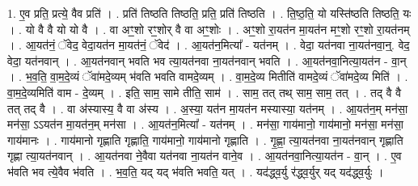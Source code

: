 \documentclass[17pt]{extarticle}
\begin{document}
1. ए॒व प्रति॒ प्रत्ये॒ वैव प्रति॑ । . प्रति॑ तिष्ठति तिष्ठति॒ प्रति॒ प्रति॑ तिष्ठति । . ति॒ष्ठ॒ति॒ यो यस्ति॑ष्ठति तिष्ठति॒ यः । . यो वै वै यो यो वै । . वा अꣳ॒॒शो रꣳ॒॒शोर् वै वा अꣳ॒॒शोः । . अꣳ॒॒शो रा॒यत॑न मा॒यत॑न मꣳ॒॒शो रꣳ॒॒शो रा॒यत॑नम् । . आ॒यत॑नं॒ ॅवेद॒ वेदा॒यत॑न मा॒यत॑नं॒ ॅवेद॑ । . आ॒यत॑न॒मित्या᳚ - यत॑नम् । . वेदा॒ यत॑नवा ना॒यत॑नवा॒न्॒. वेद॒ वेदा॒ यत॑नवान् । . आ॒यत॑नवान् भवति भव त्या॒यत॑नवा ना॒यत॑नवान् भवति । . आ॒यत॑नवा॒नित्या॒यत॑न - वा॒न् । . भ॒व॒ति॒ वा॒म॒दे॒व्यं ॅवा॑मदे॒व्यम् भ॑वति भवति वामदे॒व्यम् । . वा॒म॒दे॒व्य मितीति॑ वामदे॒व्यं ॅवा॑मदे॒व्य मिति॑ । . वा॒म॒दे॒व्यमिति॑ वाम - दे॒व्यम् । . इति॒ साम॒ सामे तीति॒ साम॑ । . साम॒ तत् तथ् साम॒ साम॒ तत् । . तद् वै वै तत् तद् वै । . वा अ॑स्यास्य॒ वै वा अ॑स्य । . अ॒स्या॒ यत॑न मा॒यत॑न मस्यास्या॒ यत॑नम् । . आ॒यत॑न॒म् मन॑सा॒ मन॑सा॒ ऽऽयत॑न मा॒यत॑न॒म् मन॑सा । . आ॒यत॑न॒मित्या᳚ - यत॑नम् । . मन॑सा॒ गाय॑मानो॒ गाय॑मानो॒ मन॑सा॒ मन॑सा॒ गाय॑मानः । . गाय॑मानो गृह्णाति गृह्णाति॒ गाय॑मानो॒ गाय॑मानो गृह्णाति । . गृ॒ह्णा॒ त्या॒यत॑नवा ना॒यत॑नवान् गृह्णाति गृह्णा त्या॒यत॑नवान् । . आ॒यत॑नवा ने॒वैवा यत॑नवा ना॒यत॑न वाने॒व । . आ॒यत॑नवा॒नित्या॒यत॑न - वा॒न् । . ए॒व भ॑वति भव त्ये॒वैव भ॑वति । . भ॒व॒ति॒ यद् यद् भ॑वति भवति॒ यत् । . यद॑द्ध्व॒र्यु र॑द्ध्व॒र्युर् यद् यद॑द्ध्व॒र्युः । \newline
\end{document}
